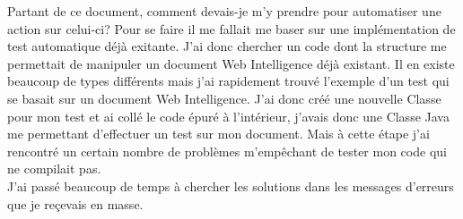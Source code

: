 Partant de ce document, comment devais-je m'y prendre pour automatiser une action sur celui-ci? Pour se faire il me fallait me baser sur une impl\'{e}mentation de test automatique d\'{e}j\`{a} exitante. J'ai donc chercher un code dont la structure me permettait de manipuler un document Web Intelligence d\'{e}j\`{a} existant. Il en existe beaucoup de types diff\'{e}rents mais j'ai rapidement trouv\'{e} l'exemple d'un test qui se basait sur un document Web Intelligence. J'ai donc cr\'{e}\'{e} une nouvelle \gls{Classe} pour mon test et ai coll\'{e} le code \'{e}pur\'{e} \`{a} l'int\'{e}rieur, j'avais donc une \gls{Classe} \gls{Java} me permettant d'effectuer un test sur mon document. Mais \`{a} cette \'{e}tape j'ai rencontr\'{e} un certain nombre de probl\`{e}mes m'emp\^{e}chant de tester mon code qui ne compilait pas.\\
J'ai pass\'{e} beaucoup de temps \`{a} chercher les solutions dans les messages d'erreurs que je re\c{c}evais en masse.\\

